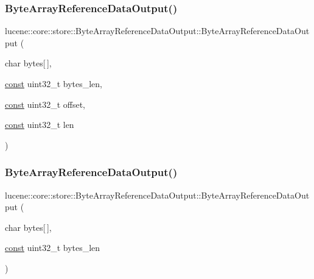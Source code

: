 \subsubsection{\texorpdfstring{Byte\+Array\+Reference\+Data\+Output()}{ByteArrayReferenceDataOutput()}\hspace{0.1cm}{\footnotesize\ttfamily [1/2]}}
{\footnotesize\ttfamily lucene\+::core\+::store\+::\+Byte\+Array\+Reference\+Data\+Output\+::\+Byte\+Array\+Reference\+Data\+Output (\begin{DoxyParamCaption}\item[{char}]{bytes\mbox{[}$\,$\mbox{]},  }\item[{\mbox{\hyperlink{ZlibCrc32_8h_a2c212835823e3c54a8ab6d95c652660e}{const}} uint32\+\_\+t}]{bytes\+\_\+len,  }\item[{\mbox{\hyperlink{ZlibCrc32_8h_a2c212835823e3c54a8ab6d95c652660e}{const}} uint32\+\_\+t}]{offset,  }\item[{\mbox{\hyperlink{ZlibCrc32_8h_a2c212835823e3c54a8ab6d95c652660e}{const}} uint32\+\_\+t}]{len }\end{DoxyParamCaption})\hspace{0.3cm}{\ttfamily [inline]}}

\mbox{\label{classlucene_1_1core_1_1store_1_1ByteArrayReferenceDataOutput_a7eb8216732243b3f2767eaba96d07959}} 
\subsubsection{\texorpdfstring{Byte\+Array\+Reference\+Data\+Output()}{ByteArrayReferenceDataOutput()}\hspace{0.1cm}{\footnotesize\ttfamily [2/2]}}
{\footnotesize\ttfamily lucene\+::core\+::store\+::\+Byte\+Array\+Reference\+Data\+Output\+::\+Byte\+Array\+Reference\+Data\+Output (\begin{DoxyParamCaption}\item[{char}]{bytes\mbox{[}$\,$\mbox{]},  }\item[{\mbox{\hyperlink{ZlibCrc32_8h_a2c212835823e3c54a8ab6d95c652660e}{const}} uint32\+\_\+t}]{bytes\+\_\+len }\end{DoxyParamCaption})\hspace{0.3cm}{\ttfamily [inline]}}



